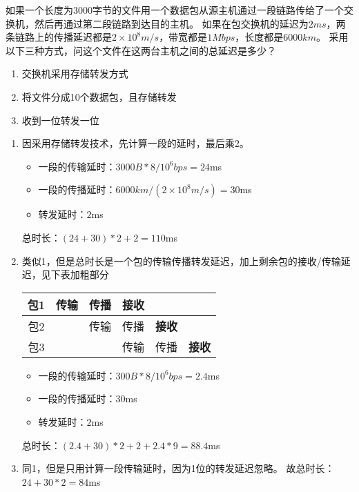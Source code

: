 \begin{example}
	如果一个长度为$3000$字节的文件用一个数据包从源主机通过一段链路传给了一个交换机，然后再通过第二段链路到达目的主机。
	如果在包交换机的延迟为$2ms$，两条链路上的传播延迟都是$2\times 10^8m/s$，带宽都是$1Mbps$，长度都是$6000km$。
	采用以下三种方式，问这个文件在这两台主机之间的总延迟是多少？
	\begin{enumerate}
		\item 交换机采用存储转发方式
		\item 将文件分成10个数据包，且存储转发
		\item 收到一位转发一位
	\end{enumerate}
\end{example}
\begin{analysis}
	\begin{enumerate}
	\item 因采用存储转发技术，先计算一段的延时，最后乘2。
	\begin{itemize}
	\item 一段的传输延时：$3000B*8/10^6bps=24$ms
	\item 一段的传播延时：$6000km/(2\times 10^8m/s)=30$ms
	\item 转发延时：$2$ms
	\end{itemize}
	总时长：$(24+30)*2+2=110$ms
	\item 类似1，但是总时长是一个包的传输传播转发延迟，加上剩余包的接收/传输延迟，见下表加粗部分
	\begin{center}
		\begin{tabular}{|c|c|c|c|c|c|}\hline
			包1 & \textbf{传输} & \textbf{传播} & \textbf{接收} & & \\\hline
			包2 &  & 传输 & 传播 & \textbf{接收} & \\\hline
			包3 &  &  & 传输 & 传播 & \textbf{接收} \\\hline
		\end{tabular}
	\end{center}
	\begin{itemize}
		\item 一段的传输延时：$300B*8/10^6bps=2.4$ms
		\item 一段的传播延时：$30$ms
		\item 转发延时：$2$ms
	\end{itemize}
	总时长：$(2.4+30)*2+2+2.4*9=88.4$ms
	\item 同1，但是只用计算一段传输延时，因为1位的转发延迟忽略。
	故总时长：$24+30*2=84$ms
\end{enumerate}
\end{analysis}